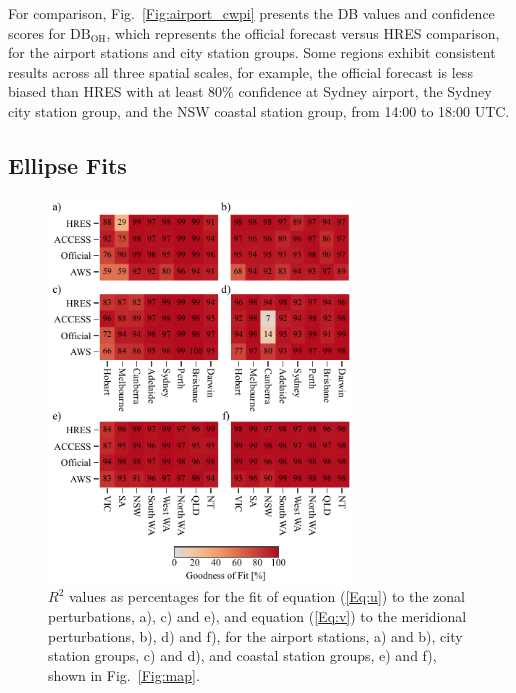 \documentclass[twocol]{ametsoc}
\begin{document}
For comparison, Fig.~\ref{Fig:airport_cwpi} presents the DB values and confidence scores for $\text{DB}_\text{OH}$, which represents the official forecast versus HRES comparison, for the airport stations and city station groups. Some regions exhibit consistent results across all three spatial scales, for example, the official forecast is less biased than HRES with at least $80 \%$ confidence at Sydney airport, the Sydney city station group, and the NSW coastal station group, from 14:00 to 18:00 UTC.  

\subsection{Ellipse Fits}

\begin{figure}
\centering
\includegraphics[width=19pc]{r_squared.pdf}
\caption{$R^2$ values as percentages for the fit of equation (\ref{Eq:u}) to the zonal perturbations, a), c) and e), and equation (\ref{Eq:v}) to the meridional perturbations, b), d) and f), for the airport stations, a) and b), city station groups, c) and d), and coastal station groups, e) and f), shown in Fig.~\ref{Fig:map}.}
\label{Fig:r_squared}
\end{figure}
\end{document}

